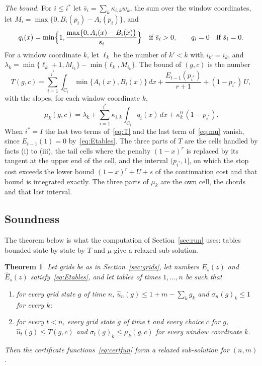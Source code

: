 \documentclass[11pt]{amsart}
\newtheorem{theorem}{Theorem}[section]
\theoremstyle{definition}
\numberwithin{equation}{section}
\newcommand{\lean}[1]{\ignorespaces}
\begin{document}
\emph{The bound.} For $i\le i^*$ let $\bar s_i=\sum_k\kappa_{i,k}w_k$, the sum over the window coordinates, let $M_i=\max\{0,B_i(p_i)-A_i(p_i)\}$, and
\[
q_i(x)=\min\Bigl\{1,\frac{\max\{0,A_i(x)-B_i(x)\}}{\bar s_i}\Bigr\}\quad\text{if } \bar s_i>0,\qquad q_i=0\quad\text{if } \bar s_i=0.
\]
For a window coordinate $k$, let $\ell_k$ be the number of $k'<k$ with $i_{k'}=i_k$, and $\lambda_k=\min\{\ell_k+1,M_{i_k}\}-\min\{\ell_k,M_{i_k}\}$. The bound of $(g,c)$ is the number
\begin{equation}\label{eq:T}
T(g,c)=\sum_{i=1}^{i^*}\int_{C_i}\min\{A_i(x),B_i(x)\}\,dx+\frac{E_{t-1}(p_{i^*})}{r+1}+(1-p_{i^*})\,U,
\end{equation}
with the slopes, for each window coordinate $k$,
\begin{equation}\label{eq:mu}
\mu_k(g,c)=\lambda_k+\sum_{i=1}^{i^*}\kappa_{i,k}\int_{C_i}q_i(x)\,dx+\kappa^0_k\,(1-p_{i^*}).
\end{equation}
When $i^*=I$ the last two terms of~\eqref{eq:T} and the last term of~\eqref{eq:mu} vanish, since $E_{t-1}(1)=0$ by~\eqref{eq:Etables}. The three parts of $T$ are the cells handled by facts (i) to (iii), the tail cells where the penalty $(1-x)^r$ is replaced by its tangent at the upper end of the cell, and the interval $(p_{i^*},1]$, on which the stop cost exceeds the lower bound $(1-x)^r+U+s$ of the continuation cost and that bound is integrated exactly. The three parts of $\mu_k$ are the own cell, the chords and that last interval.

\subsection{Soundness}
The theorem below is what the computation of Section~\ref{sec:run} uses: tables bounded state by state by $T$ and $\mu$ give a relaxed sub-solution.

\begin{theorem}\label{thm:sound}\lean{Robbins.Cert.SO.relaxed_of_tables}
Let grids be as in Section~\ref{sec:grids}, let numbers $E_s(z)$ and $\hat E_s(z)$ satisfy~\eqref{eq:Etables}, and let tables of times $1,\dots,n$ be such that
\begin{enumerate}[label=(\roman*)]
\item for every grid state $g$ of time $n$, $\hat u_n(g)\le 1+m-\sum_kg_k$ and $\sigma_n(g)_k\le1$ for every $k$;
\item for every $t<n$, every grid state $g$ of time $t$ and every choice $c$ for $g$, $\hat u_t(g)\le T(g,c)$ and $\sigma_t(g)_k\le\mu_k(g,c)$ for every window coordinate $k$.
\end{enumerate}
Then the certificate functions~\eqref{eq:certfun} form a relaxed sub-solution for $(n,m)$.
\end{theorem}
\end{document}
